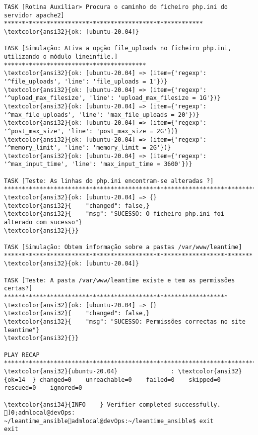 \documentclass{scrartcl}
\begin{document}
\begin{Verbatim}
TASK [Rotina Auxiliar> Procura o caminho do ficheiro php.ini do servidor apache2] ********************************************************
\textcolor{ansi32}{ok: [ubuntu-20.04]}

TASK [Simulação: Ativa a opção file_uploads no ficheiro php.ini, utilizando o módulo lineinfile.] ****************************************
\textcolor{ansi32}{ok: [ubuntu-20.04] => (item={'regexp': '^file_uploads', 'line': 'file_uploads = 1'})}
\textcolor{ansi32}{ok: [ubuntu-20.04] => (item={'regexp': '^upload_max_filesize', 'line': 'upload_max_filesize = 1G'})}
\textcolor{ansi32}{ok: [ubuntu-20.04] => (item={'regexp': '^max_file_uploads', 'line': 'max_file_uploads = 20'})}
\textcolor{ansi32}{ok: [ubuntu-20.04] => (item={'regexp': '^post_max_size', 'line': 'post_max_size = 2G'})}
\textcolor{ansi32}{ok: [ubuntu-20.04] => (item={'regexp': '^memory_limit', 'line': 'memory_limit = 2G'})}
\textcolor{ansi32}{ok: [ubuntu-20.04] => (item={'regexp': '^max_input_time', 'line': 'max_input_time = 3600'})}

TASK [Teste: As linhas do php.ini encontram-se alteradas ?] ******************************************************************************
\textcolor{ansi32}{ok: [ubuntu-20.04] => {}
\textcolor{ansi32}{    "changed": false,}
\textcolor{ansi32}{    "msg": "SUCESSO: O ficheiro php.ini foi alterado com sucesso"}
\textcolor{ansi32}{}}

TASK [Simulação: Obtem informação sobre a pastas /var/www/leantime] **********************************************************************
\textcolor{ansi32}{ok: [ubuntu-20.04]}

TASK [Teste: A pasta /var/www/leantime existe e tem as permissões certas?] ***************************************************************
\textcolor{ansi32}{ok: [ubuntu-20.04] => {}
\textcolor{ansi32}{    "changed": false,}
\textcolor{ansi32}{    "msg": "SUCESSO: Permissões correctas no site leantime"}
\textcolor{ansi32}{}}

PLAY RECAP *******************************************************************************************************************************
\textcolor{ansi32}{ubuntu-20.04}               : \textcolor{ansi32}{ok=14  } changed=0    unreachable=0    failed=0    skipped=0    rescued=0    ignored=0

\textcolor{ansi34}{INFO    } Verifier completed successfully.
]0;admlocal@devOps: ~/leantime_ansibleadmlocal@devOps:~/leantime_ansible$ exit
exit

\end{Verbatim}
\end{document}

